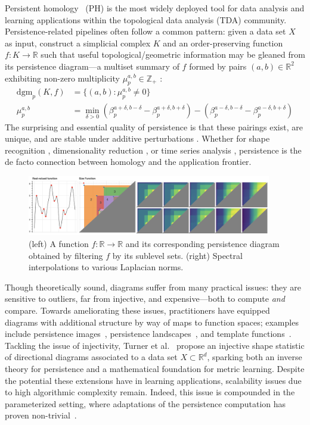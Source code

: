\documentclass[pdflatex,sn-mathphys-num]{sn-jnl}
\newcommand{\dgm}[0]{\mathrm{dgm}}
\begin{document}
Persistent homology~\cite{edelsbrunner2000topological} (PH) is the most widely deployed tool for data analysis and learning applications within the topological data analysis (TDA) community. 
Persistence-related pipelines often follow a common pattern: given a data set $X$ as input, construct a simplicial complex $K$ and an order-preserving function $f: K \to \mathbb{R}$ such that useful topological/geometric information may be gleaned from its persistence diagram—a multiset summary of $f$ formed by pairs $(a, b) \in \mathbb{R}^2$ exhibiting non-zero multiplicity $\mu_p^{a , b} \in \mathbb{Z}_+$ \cite{cerri2013betti}: 
\begin{align*}
	\dgm_p (K, f) &= \{ (a,b) : \mu_p^{a,b} \neq 0 \} \\
	\mu_p^{a,b} &= \min_{\delta > 0} (\beta_p^{a+\delta, b-\delta} - \beta_p^{a+\delta, b+\delta}) - (\beta_p^{a-\delta, b-\delta} - \beta_p^{a-\delta, b+\delta}) 
\end{align*}
\noindent The surprising and essential quality of persistence is that these pairings exist, are unique, and are stable under additive perturbations \cite{cohen2005stability}. Whether for shape recognition \cite{chazal2009gromov}, dimensionality reduction \cite{scoccola2023fibered}, or time series analysis \cite{perea2016persistent}, persistence is the de facto connection between homology and the application frontier.


\begin{figure}\label{fig:overview}
\centering
\includegraphics[width=0.95\textwidth]{../images/spectral_relax_size_func.png}	
\caption{ (left) A function $f: \mathbb{R} \to \mathbb{R}$ and its corresponding persistence diagram obtained by filtering $f$ by its sublevel sets. (right) Spectral interpolations to various Laplacian norms. }
\end{figure}

Though theoretically sound, diagrams suffer from many practical issues: they are sensitive to outliers, far from injective, and expensive---both to compute \textit{and} compare. Towards ameliorating these issues, practitioners have equipped diagrams with additional structure by way of maps to function spaces; examples include persistence images~\cite{adams2017persistence}, persistence landscapes~\cite{bubenik2015statistical}, and template functions~\cite{perea2022approximating}. Tackling the issue of injectivity, Turner et al.~\cite{turner2014persistent} propose an injective shape statistic of directional diagrams associated to a data set $X \subset \mathbb{R}^d$, sparking both an inverse theory for persistence and a mathematical foundation for metric learning. Despite the potential these extensions have in learning applications, scalability issues due to high algorithmic complexity remain. Indeed, this issue is compounded in the parameterized setting, where adaptations of the persistence computation has proven non-trivial~\cite{piekenbrock2021move}.
\end{document}
